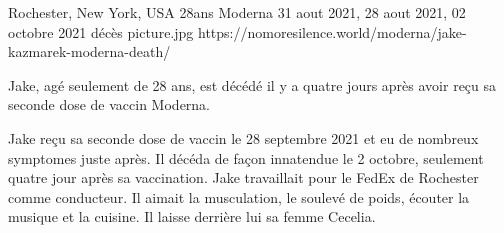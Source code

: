           {Rochester, New York, USA}
          {28ans}
          {Moderna}
          {31 aout 2021, 28 aout 2021, 02 octobre 2021}
          {décès}
          {picture.jpg}
          {https://nomoresilence.world/moderna/jake-kazmarek-moderna-death/}
          {

Jake, agé seulement de 28 ans, est décédé il y a quatre jours après avoir reçu
sa seconde dose de vaccin Moderna.

Jake reçu sa seconde dose de vaccin le 28 septembre 2021 et eu de nombreux
symptomes juste après. Il décéda de façon innatendue le 2 octobre, seulement
quatre jour après sa vaccination. Jake travaillait pour le FedEx de Rochester
comme conducteur. Il aimait la musculation, le soulevé de poids, écouter la
musique et la cuisine. Il laisse derrière lui sa femme Cecelia.

}
